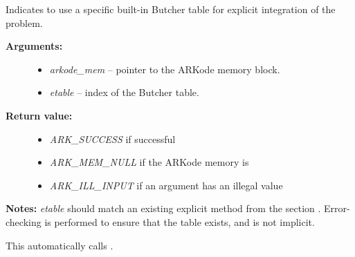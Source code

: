 \documentclass[letterpaper,10pt,english]{sphinxmanual}
\begin{document}
\begin{fulllineitems}
\label{c_interface/User_callable:c.ARKodeSetERKTableNum}
Indicates to use a specific built-in Butcher table for explicit
integration of the problem.
\begin{description}
\item[{\textbf{Arguments:}}] \leavevmode\begin{itemize}
\item {} 
\emph{arkode\_mem} -- pointer to the ARKode memory block.

\item {} 
\emph{etable} -- index of the Butcher table.

\end{itemize}

\item[{\textbf{Return value:}}] \leavevmode\begin{itemize}
\item {} 
\emph{ARK\_SUCCESS} if successful

\item {} 
\emph{ARK\_MEM\_NULL} if the ARKode memory is 

\item {} 
\emph{ARK\_ILL\_INPUT} if an argument has an illegal value

\end{itemize}

\end{description}

\textbf{Notes:} \emph{etable} should match an existing explicit method from
the section {\hyperref[Butcher:butcher-explicit]{\emph{}}}.  Error-checking is performed
to ensure that the table exists, and is not implicit.

This automatically calls {\hyperref[c_interface/User_callable:c.ARKodeSetExplicit]{\emph{}}}.

\end{fulllineitems}

\end{document}
